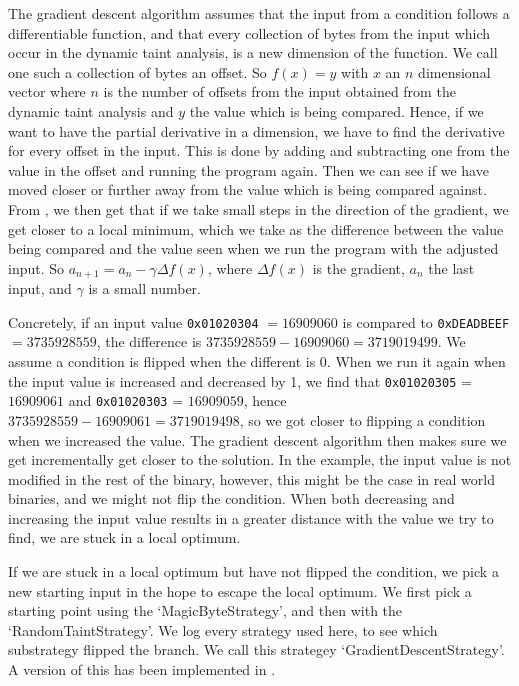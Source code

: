 The gradient descent algorithm \cite{ruder2016overview} assumes that the input from a condition follows a differentiable function, and that every collection of bytes from the input which occur in the dynamic taint analysis, is a new dimension of the function. We call one such a collection of bytes an offset. So $f(x) = y$ with $x$ an $n$ dimensional vector where $n$ is the number of offsets from the input obtained from the dynamic taint analysis and $y$ the value which is being compared. Hence, if we want to have the partial derivative in a dimension, we have to find the derivative for every offset in the input. This is done by adding and subtracting one from the value in the offset and running the program again. Then we can see if we have moved closer or further away from the value which is being compared against. From \cite{ruder2016overview}, we then get that if we take small steps in the direction of the gradient, we get closer to a local minimum, which we take as the difference between the value being compared and the value seen when we run the program with the adjusted input. So $a_{n+1} = a_n - \gamma \Delta f(x)$, where $\Delta f(x)$ is the gradient, $a_n$ the last input, and $\gamma$ is a small number.

Concretely, if an input value \texttt{0x01020304} $= 16909060$ is compared to \texttt{0xDEADBEEF} $= 3735928559$, the difference is $3735928559 - 16909060 = 3719019499$. We assume a condition is flipped when the different is $0$. When we run it again when the input value is increased and decreased by 1, we find that \texttt{0x01020305} = $16909061$ and \texttt{0x01020303} = $16909059$, hence $3735928559 - 16909061 = 3719019498$, so we got closer to flipping a condition when we increased the value. The gradient descent algorithm then makes sure we get incrementally get closer to the solution. In the example, the input value is not modified in the rest of the binary, however, this might be the case in real world binaries, and we might not flip the condition. When both decreasing and increasing the input value results in a greater distance with the value we try to find, we are stuck in a local optimum.

If we are stuck in a local optimum but have not flipped the condition, we pick a new starting input in the hope to escape the local optimum. We first pick a starting point using the `MagicByteStrategy', and then with the `RandomTaintStrategy'. We log every strategy used here, to see which substrategy flipped the branch.
We call this strategey `GradientDescentStrategy'. A version of this has been implemented in \cite{chen2018angora, shen2019neuro, she2019neuzz}.

